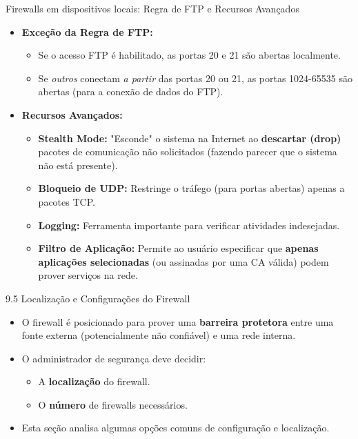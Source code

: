 \begin{frame}{Firewalls em dispositivos locais: Regra de FTP e Recursos Avançados}
    \begin{itemize}
        \item \textbf{Exceção da Regra de FTP:}
              \begin{itemize}
                  \item Se o acesso FTP é habilitado, as portas 20 e 21 são abertas localmente.
                  \item Se \textit{outros} conectam \textit{a partir} das portas 20 ou 21, as portas 1024-65535 são abertas (para a conexão de dados do FTP).
              \end{itemize}

        \item \textbf{Recursos Avançados:}
              \begin{itemize}
                  \item \textbf{Stealth Mode:} "Esconde" o sistema na Internet ao \textbf{descartar (drop)} pacotes de comunicação não solicitados (fazendo parecer que o sistema não está presente).
                  \item \textbf{Bloqueio de UDP:} Restringe o tráfego (para portas abertas) apenas a pacotes TCP.
                  \item \textbf{Logging:} Ferramenta importante para verificar atividades indesejadas.
                  \item \textbf{Filtro de Aplicação:} Permite ao usuário especificar que \textbf{apenas aplicações selecionadas} (ou assinadas por uma CA válida) podem prover serviços na rede.
              \end{itemize}
    \end{itemize}
\end{frame}

\begin{frame}{9.5 Localização e Configurações do Firewall}
    \begin{itemize}
        \item O firewall é posicionado para prover uma \textbf{barreira protetora} entre uma fonte externa (potencialmente não confiável) e uma rede interna.

        \item O administrador de segurança deve decidir:
              \begin{itemize}
                  \item A \textbf{localização} do firewall.
                  \item O \textbf{número} de firewalls necessários.
              \end{itemize}

        \item Esta seção analisa algumas opções comuns de configuração e localização.
    \end{itemize}
\end{frame}

